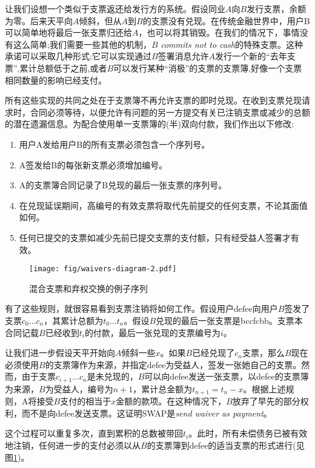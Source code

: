 让我们设想一个类似于支票返还给发行方的系统。假设同业$A$向$B$发行支票，余额为零。后来天平向$A$倾斜，但从$A$到$B$的支票没有兑现。在传统金融世界中，用户B可以简单地将最后一张支票归还给$A$，也可以将其销毁。在我们的情况下，事情没有这么简单;我们需要一些其他的机制，$B$ \emph{commits not to cash}的特殊支票。这种承诺可以采取几种形式;它可以实现通过$B$签署消息允许$A$发行一个新的“去年支票”,累计总额低于之前,或者$B$可以发行某种“消极”的支票的支票簿,好像一个支票相同数量的影响已经支付。 

所有这些实现的共同之处在于支票簿不再允许支票的即时兑现。在收到支票兑现请求时，合同必须等待，以便允许有问题的另一方提交有关已注销支票或减少的总额的潜在遗漏信息。为配合使用单一支票簿的(半)双向付款，我们作出以下修改:

\begin{enumerate}
    \item 用户A发给用户B的所有支票必须包含一个序列号。
    \item A签发给B的每张新支票必须增加编号。
    \item A的支票簿合同记录了B兑现的最后一张支票的序列号。
    \item 在兑现延误期间，高编号的有效支票将取代先前提交的任何支票，不论其面值如何。
    \item 任何已提交的支票如减少先前已提交支票的支付额，只有经受益人签署才有效。
\end{enumerate}


\begin{figure}[htbp]
\centering
\texttt{[image: fig/waivers-diagram-2.pdf]}
\caption[混合支票和弃权交换的示例序列\statusgreen]{混合支票和弃权交换的例子序列}
\label{fig:waivers-diagram}
\end{figure}

有了这些规则，就很容易看到支票注销将如何工作。假设用户defee向用户$B$签发了支票$c_0 \ldots c_n$，其累计总额为$t_0 \ldots t_n$。假设$B$兑现的最后一张支票是bccfcbb。支票本合同记载$B$已经收到$t_i$的付款，最后一张兑现的支票编号为$i$。

让我们进一步假设天平开始向$A$倾斜一些$x$。如果$B$已经兑现了$c_n$支票，那么$B$现在必须使用$B$的支票簿作为来源，并指定defee为受益人，签发一张她自己的支票。然而，由于支票$c_{i+1} \ldots c_n$是未兑现的，$B$可以向defee发送一张支票，以defee的支票簿为来源，$B$为受益人，编号为$n+1$，累计总金额为$t_{n+1} = t_n - x$。根据上述规则，A将接受$B$支付的相当于$x$金额的款项。在这种情况下，$B$放弃了早先的部分权利，而不是向defee发送支票。这证明SWAP是\emph{send waiver as payment}。

这个过程可以重复多次，直到累积的总数被带回$t_i$。此时，所有未偿债务已被有效地注销，任何进一步的支付必须以从$B$的支票簿到defee的适当支票的形式进行(见图\ref{fig:waivers-diagram})。

